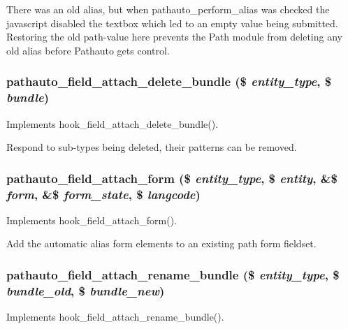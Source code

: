 There was an old alias, but when pathauto\_\-perform\_\-alias was checked the javascript disabled the textbox which led to an empty value being submitted. Restoring the old path-\/value here prevents the Path module from deleting any old alias before Pathauto gets control.\hypertarget{pathauto_8module_a52aef356ab5cb0ed895cd418645512f5}{
\subsubsection[{pathauto\_\-field\_\-attach\_\-delete\_\-bundle}]{\setlength{\rightskip}{0pt plus 5cm}pathauto\_\-field\_\-attach\_\-delete\_\-bundle (\$ {\em entity\_\-type}, \/  \$ {\em bundle})}}
\label{pathauto_8module_a52aef356ab5cb0ed895cd418645512f5}
Implements hook\_\-field\_\-attach\_\-delete\_\-bundle().

Respond to sub-\/types being deleted, their patterns can be removed. \hypertarget{pathauto_8module_a5db998c6dbde2b0ccde267df64072f63}{
\subsubsection[{pathauto\_\-field\_\-attach\_\-form}]{\setlength{\rightskip}{0pt plus 5cm}pathauto\_\-field\_\-attach\_\-form (\$ {\em entity\_\-type}, \/  \$ {\em entity}, \/  \&\$ {\em form}, \/  \&\$ {\em form\_\-state}, \/  \$ {\em langcode})}}
\label{pathauto_8module_a5db998c6dbde2b0ccde267df64072f63}
Implements hook\_\-field\_\-attach\_\-form().

Add the automatic alias form elements to an existing path form fieldset. \hypertarget{pathauto_8module_a2a4e896ac2a2cadbef2fba1d848573c6}{
\subsubsection[{pathauto\_\-field\_\-attach\_\-rename\_\-bundle}]{\setlength{\rightskip}{0pt plus 5cm}pathauto\_\-field\_\-attach\_\-rename\_\-bundle (\$ {\em entity\_\-type}, \/  \$ {\em bundle\_\-old}, \/  \$ {\em bundle\_\-new})}}
\label{pathauto_8module_a2a4e896ac2a2cadbef2fba1d848573c6}
Implements hook\_\-field\_\-attach\_\-rename\_\-bundle().

